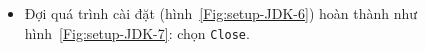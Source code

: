 \documentclass[13pt,a4paper]{extreport}
\begin{document}
\begin{itemize}
\begin{itemize}
				\item Đợi quá trình cài đặt (hình~\ref{Fig:setup-JDK-6}) hoàn thành như hình~\ref{Fig:setup-JDK-7}: chọn \verb|Close|.		
					\begin{figure}[!h]
						\begin{center}
								\hspace{.5cm}
							\\

\end{center}
\end{figure}
\end{itemize}
\end{itemize}
\end{document}
